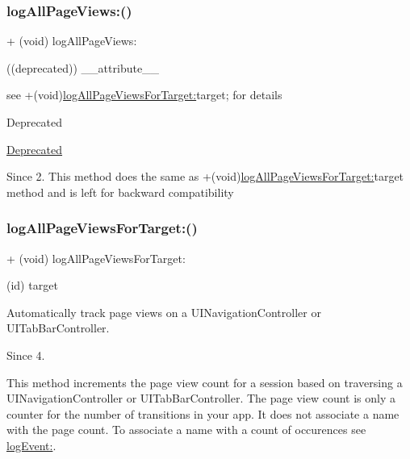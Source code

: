 \subsubsection{\texorpdfstring{log\+All\+Page\+Views\+:()}{logAllPageViews:()}}
{\footnotesize\ttfamily + (void) log\+All\+Page\+Views\+: \begin{DoxyParamCaption}\item[{((deprecated))}]{\+\_\+\+\_\+attribute\+\_\+\+\_\+ }\end{DoxyParamCaption}}



see +(void)\hyperlink{interfaceFlurry_ad8222c3e2257fb8aa22e9c93aa465ca6}{log\+All\+Page\+Views\+For\+Target\+:}target; for details 

\begin{DoxyRefDesc}{Deprecated}
\item[\hyperlink{deprecated__deprecated000226}{Deprecated}]\end{DoxyRefDesc}
\begin{DoxySince}{Since}
2. This method does the same as +(void)\hyperlink{interfaceFlurry_ad8222c3e2257fb8aa22e9c93aa465ca6}{log\+All\+Page\+Views\+For\+Target\+:}target method and is left for backward compatibility 
\end{DoxySince}
\mbox{\label{interfaceFlurry_ad8222c3e2257fb8aa22e9c93aa465ca6}} 
\subsubsection{\texorpdfstring{log\+All\+Page\+Views\+For\+Target\+:()}{logAllPageViewsForTarget:()}}
{\footnotesize\ttfamily + (void) log\+All\+Page\+Views\+For\+Target\+: \begin{DoxyParamCaption}\item[{(id)}]{target }\end{DoxyParamCaption}}



Automatically track page views on a {\ttfamily U\+I\+Navigation\+Controller} or {\ttfamily U\+I\+Tab\+Bar\+Controller}. 

\begin{DoxySince}{Since}
4.
\end{DoxySince}
This method increments the page view count for a session based on traversing a U\+I\+Navigation\+Controller or U\+I\+Tab\+Bar\+Controller. The page view count is only a counter for the number of transitions in your app. It does not associate a name with the page count. To associate a name with a count of occurences see \hyperlink{interfaceFlurry_a5433aaf247d3e14120ba05877d034a61}{log\+Event\+:}.

